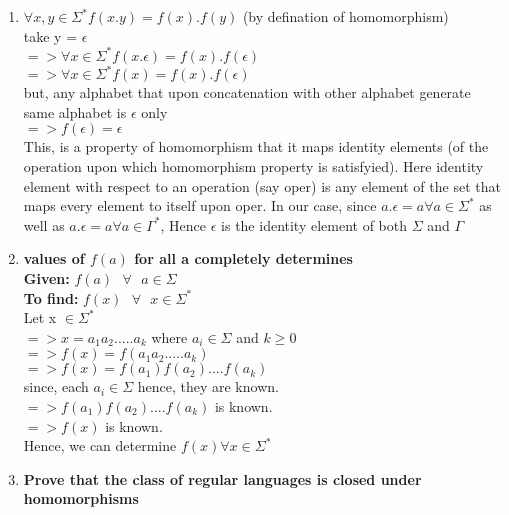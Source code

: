 \documentclass{article}
\begin{document}
\begin{enumerate}
    \item {}
    
    $\forall x,y \in \Sigma^{*} f(x.y) = f(x).f(y)$ (by defination of homomorphism)\\
    take y = $\epsilon$\\
    $=> \forall x \in \Sigma^{*} f(x.\epsilon) = f(x).f(\epsilon)$\\
    $=> \forall x \in \Sigma^{*} f(x) = f(x).f(\epsilon)$\\
    but, any alphabet that upon concatenation with other alphabet generate same alphabet is $\epsilon$ only\\
    $=> f(\epsilon) =\epsilon$\\

    This, is a property of homomorphism that it maps identity elements (of the operation upon which homomorphism property is satisfyied). Here identity element with respect to an operation (say oper) is any element of the set that maps
    every element to itself upon oper.
    In our case, since $a.\epsilon = a \forall a \in \Sigma^{*} $ as well as $a.\epsilon = a \forall a \in \Gamma^{*} $, Hence $\epsilon$ is the identity element of both $\Sigma$ and $\Gamma$

    \item \textbf{values of $f(a)$ for all a \boldsymbol{$\in \Sigma$} completely determines }\\
    
    \textbf{Given: } $f(a) \text{ } \forall \text{ }  a \in \Sigma$\\
    \textbf{To find: } $f(x) \text{ } \forall \text{ }  x \in \Sigma^{*}$\\

    Let x $\in \Sigma^{*}$\\
    $=> x = a_1 a_2 ..... a_k$ where $a_i \in \Sigma $ and $k \geq 0$\\
    $=> f(x) = f(a_1 a_2 ..... a_k)$\\
    $=> f(x) = f(a_1)f(a_2)....f(a_k)$\\
    since, each $a_i \in \Sigma$ hence, they are known.\\
    $=> f(a_1)f(a_2)....f(a_k)$ is known.\\
    $=> f(x) $ is known.\\
    Hence, we can determine $f(x) \forall x \in \Sigma^{*}$

    \pagebreak
    \item \textbf{Prove that the class of regular languages is closed under homomorphisms}


\end{enumerate}
\end{document}
